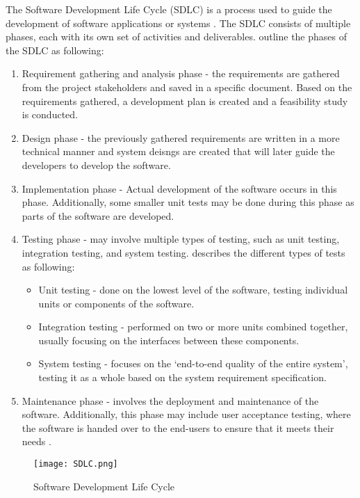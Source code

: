 The Software Development Life Cycle (SDLC) is a process used to guide the development of software applications or systems \parencite{sdlc1}. The SDLC consists of multiple phases, each with its own set of activities and deliverables. \textcite{sdlc2} outline the phases of the SDLC as following:
\begin{enumerate}
    \item Requirement gathering and analysis phase - the requirements are gathered from the project stakeholders and saved in a specific document. Based on the requirements gathered, a development plan is created and a feasibility study is conducted.
    \item Design phase - the previously gathered requirements are written in a more technical manner and system deisngs are created that will later guide the developers to develop the software. 
    \item Implementation phase - Actual development of the software occurs in this phase. Additionally, some smaller unit tests may be done during this phase as parts of the software are developed.
    \item Testing phase - may involve multiple types of testing, such as unit testing, integration testing, and system testing. \textcite{testing} describes the different types of tests as following:
    \begin{itemize}
    \item Unit testing - done on the lowest level of the software, testing individual units or components of the software.
    \item Integration testing - performed on two or more units combined together, usually focusing on the interfaces between these components.
    \item System testing - focuses on the `end-to-end quality of the entire system', testing it as a whole based on the system requirement specification.
    \end{itemize}
    \item Maintenance phase - involves the deployment and maintenance of the software. Additionally, this phase may include user acceptance testing, where the software is handed over to the end-users to ensure that it meets their needs \parencite{testing}. 
\end{enumerate}

\begin{figure}[ht]
    \centering
    \texttt{[image: SDLC.png]}
    \caption{Software Development Life Cycle}
    \label{fig:sdlc}
\end{figure}

